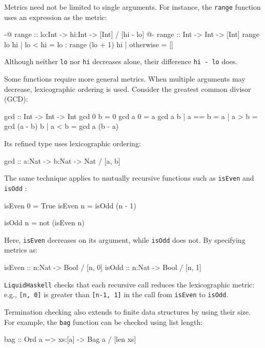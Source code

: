 Metrics need not be limited to single arguments.
For instance, the \texttt{range} function uses an expression as the metric:

\begin{code}
  {-@ range :: lo:Int -> hi:Int -> [Int] / [hi - lo] @-}
  range :: Int -> Int -> [Int]
  range lo hi
  | lo < hi = lo : range (lo + 1) hi
  | otherwise = []
\end{code}

Although neither \texttt{lo} nor \texttt{hi} decreases alone, their difference \texttt{hi - lo} does.

Some functions require more general metrics.
When multiple arguments may decrease, lexicographic ordering is used.
Consider the greatest common divisor (GCD):

\begin{code}
  gcd :: Int -> Int -> Int
  gcd 0 b = 0
  gcd a 0 = a
  gcd a b | a == b = a
  | a > b = gcd (a - b) b
  | a < b = gcd a (b - a)
\end{code}

Its refined type uses lexicographic ordering:

\begin{code}
  gcd :: a:Nat -> b:Nat -> Nat / [a, b]
\end{code}

The same technique applies to mutually recursive functions such as \texttt{isEven} and \texttt{isOdd} \cite{vazou_liquidhaskell_2014}:

\begin{code}
isEven 0 = True
isEven n = isOdd (n - 1)

isOdd n = not (isEven n)
\end{code}

Here, \texttt{isEven} decreases on its argument, while \texttt{isOdd} does not.
By specifying metrics as:

\begin{code}
isEven :: n:Nat -> Bool / [n, 0]
isOdd :: n:Nat -> Bool / [n, 1]
\end{code}

\texttt{LiquidHaskell} checks that each recursive call reduces the lexicographic metric: e.g., \texttt{[n, 0]} is greater than \texttt{[n-1, 1]} in the call from \texttt{isEven} to \texttt{isOdd}.

Termination checking also extends to finite data structures by using their size.
For example, the \texttt{bag} function can be checked using list length:

\begin{code}
bag :: Ord a => xs:[a] -> Bag a / [len xs]
\end{code}

